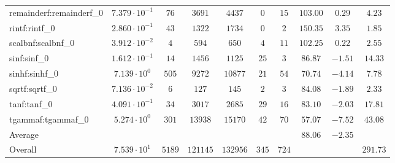 \begin{tabular}{|l|c|c|c|c|c|c|c|c|c|}
remainderf:remainderf\_0 & $ 7.379 \cdot 10^{-1} $ & $ 76     $ & $ 3691   $ & $ 4437   $ & $ 0   $ & $ 15  $ & $ 103.00      $ & $ 0.29    $ & $ 4.23    $ \\
rintf:rintf\_0           & $ 2.860 \cdot 10^{-1} $ & $ 43     $ & $ 1322   $ & $ 1734   $ & $ 0   $ & $ 2   $ & $ 150.35      $ & $ 3.35    $ & $ 1.85    $ \\
scalbnf:scalbnf\_0       & $ 3.912 \cdot 10^{-2} $ & $ 4      $ & $ 594    $ & $ 650    $ & $ 4   $ & $ 11  $ & $ 102.25      $ & $ 0.22    $ & $ 2.55    $ \\
sinf:sinf\_0             & $ 1.612 \cdot 10^{-1} $ & $ 14     $ & $ 1456   $ & $ 1125   $ & $ 25  $ & $ 3   $ & $ 86.87       $ & $ -1.51   $ & $ 14.33   $ \\
sinhf:sinhf\_0           & $ 7.139 \cdot 10^{0}  $ & $ 505    $ & $ 9272   $ & $ 10877  $ & $ 21  $ & $ 54  $ & $ 70.74       $ & $ -4.14   $ & $ 7.78    $ \\
sqrtf:sqrtf\_0           & $ 7.136 \cdot 10^{-2} $ & $ 6      $ & $ 127    $ & $ 145    $ & $ 2   $ & $ 3   $ & $ 84.08       $ & $ -1.89   $ & $ 2.33    $ \\
tanf:tanf\_0             & $ 4.091 \cdot 10^{-1} $ & $ 34     $ & $ 3017   $ & $ 2685   $ & $ 29  $ & $ 16  $ & $ 83.10       $ & $ -2.03   $ & $ 17.81   $ \\
tgammaf:tgammaf\_0       & $ 5.274 \cdot 10^{0}  $ & $ 301    $ & $ 13938  $ & $ 15170  $ & $ 42  $ & $ 70  $ & $ 57.07       $ & $ -7.52   $ & $ 43.08   $ \\
\hline
Average                  & $                     $ & $        $ & $        $ & $        $ & $     $ & $     $ & $ 88.06       $ & $ -2.35   $ & $         $ \\
\hline
Overall                  & $ 7.539 \cdot 10^{1}  $ & $ 5189   $ & $ 121145 $ & $ 132956 $ & $ 345 $ & $ 724 $ & $             $ & $         $ & $ 291.73  $ \\
\hline
\end{tabular}
